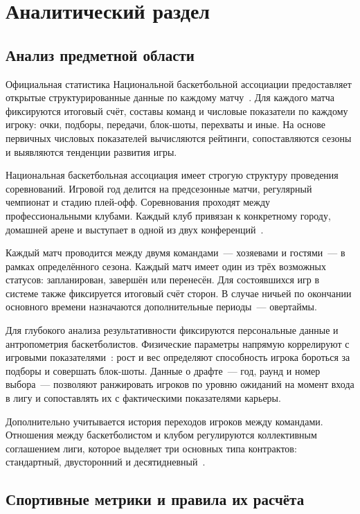 \chapter{Аналитический раздел}

\section{Анализ предметной области}

Официальная статистика Национальной баскетбольной ассоциации предоставляет
открытые структурированные данные по каждому матчу~\cite{nba-stats}. Для каждого матча фиксируются итоговый
счёт, составы команд и числовые показатели по каждому игроку: очки, подборы,
передачи, блок-шоты, перехваты и иные. На основе первичных числовых показателей
вычисляются рейтинги, сопоставляются сезоны и выявляются тенденции развития игры.

Национальная баскетбольная ассоциация имеет строгую структуру проведения
соревнований. Игровой год делится на предсезонные матчи, регулярный чемпионат
и стадию плей-офф. Соревнования проходят между профессиональными клубами.
Каждый клуб привязан к конкретному городу, домашней арене и выступает
в одной из двух конференций~\cite{nba-stats}.

Каждый матч проводится между двумя командами~--- хозяевами и гостями~---
в рамках определённого сезона. Каждый матч имеет один из трёх возможных статусов: запланирован, завершён или перенесён. Для состоявшихся игр в системе также фиксируется итоговый счёт сторон.
В случае ничьей по окончании основного времени назначаются дополнительные
периоды~--- овертаймы.

Для глубокого анализа результативности фиксируются персональные данные
и антропометрия баскетболистов. Физические параметры напрямую коррелируют
с игровыми показателями~\cite{oliver}: рост и вес определяют способность игрока
бороться за подборы и совершать блок-шоты. Данные о драфте~--- год, раунд
и номер выбора~--- позволяют ранжировать игроков по уровню ожиданий
на момент входа в лигу и сопоставлять их с фактическими показателями карьеры.

Дополнительно учитывается история переходов игроков между командами.
Отношения между баскетболистом и клубом регулируются коллективным
соглашением лиги, которое выделяет три основных типа контрактов: стандартный,
двусторонний и десятидневный~\cite{nba-cba}.

\section{Спортивные метрики и правила их расчёта}


